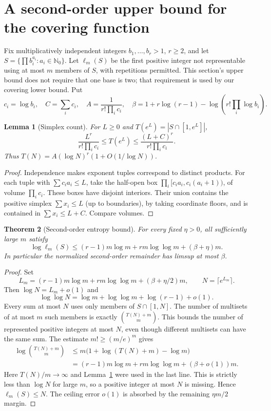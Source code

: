 \documentclass[11pt]{article}
\newtheorem{theorem}{Theorem}[section]
\newtheorem{lemma}[theorem]{Lemma}
\newcommand{\NN}{\mathbb N_0}
\begin{document}
\section{A second-order upper bound for the covering function}
Fix multiplicatively independent integers $b_1,\ldots,b_r>1$, $r\ge2$,
and let $S=\{\prod b_i^{a_i}:a_i\in\NN\}$. Let $\ell_m(S)$ be the first
positive integer not representable using at most $m$ members of $S$,
with repetitions permitted. This section's upper bound does not require
that one base is two; that requirement is used by our covering lower bound.
Put
\[
c_i=\log b_i,\quad C=\sum_i c_i,\quad
A=\frac1{r!\prod_i c_i},\quad
\beta=1+r\log(r-1)-\log\!\left(r!\prod_i\log b_i\right).
\]

\begin{lemma}[Simplex count]\label{lem:simplex}
For $L\ge0$ and $T(e^L)=|S\cap[1,e^L]|$,
\[
\frac{L^r}{r!\prod_i c_i}\le T(e^L)
\le\frac{(L+C)^r}{r!\prod_i c_i}.
\]
Thus $T(N)=A(\log N)^r(1+O(1/\log N))$.
\end{lemma}
\begin{proof}
Independence makes exponent tuples correspond to distinct products.
For each tuple with $\sum c_i a_i\le L$, take the half-open box
$\prod_i[c_i a_i,c_i(a_i+1))$, of volume $\prod_i c_i$.
These boxes have disjoint interiors. Their union contains the positive
simplex $\sum x_i\le L$ (up to boundaries), by taking coordinate floors,
and is contained in $\sum x_i\le L+C$. Compare volumes.
\end{proof}

\begin{theorem}[Second-order entropy bound]\label{thm:entropy}
For every fixed $\eta>0$, all sufficiently large $m$ satisfy
\begin{equation}\label{eq:entropy}
\log\ell_m(S)\le(r-1)m\log m+rm\log\log m+(\beta+\eta)m.
\end{equation}
In particular the normalized second-order remainder has limsup at most
$\beta$.
\end{theorem}
\begin{proof}
Set
\[
L_m=(r-1)m\log m+rm\log\log m+(\beta+\eta/2)m,
\qquad N=\lceil e^{L_m}\rceil.
\]
Then $\log N=L_m+o(1)$ and
\[
\log\log N=\log m+\log\log m+\log(r-1)+o(1).
\]
Every sum at most $N$ uses only members of $S\cap[1,N]$. The number
of multisets of at most $m$ such members is exactly $\binom{T(N)+m}{m}$.
This bounds the number of represented positive integers at most $N$,
even though different multisets can have the same sum.
The estimate $m!\ge(m/e)^m$ gives
\begin{align*}
\log\binom{T(N)+m}{m}
&\le m\bigl(1+\log(T(N)+m)-\log m\bigr)\\
&=(r-1)m\log m+rm\log\log m+(\beta+o(1))m.
\end{align*}
Here $T(N)/m\to\infty$ and Lemma~\ref{lem:simplex} were used in the
last line. This is strictly less than $\log N$ for large $m$, so a
positive integer at most $N$ is missing. Hence $\ell_m(S)\le N$.
The ceiling error $o(1)$ is absorbed by the remaining $\eta m/2$ margin.
\end{proof}
\end{document}

